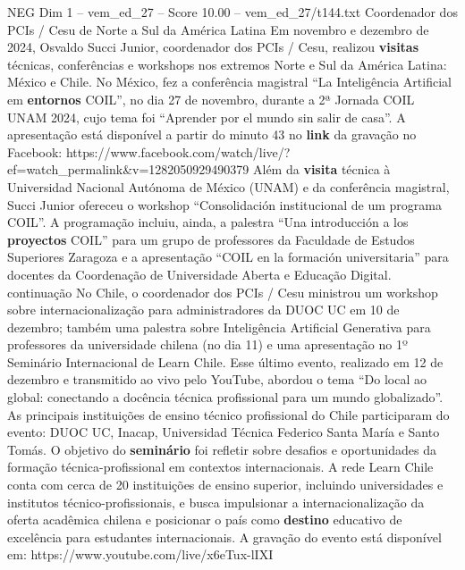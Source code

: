 \begin{textsample}{NEG Dim 1 – vem\_ed\_27 – Score 10.00 – vem\_ed\_27/t144.txt}  \label{ex:f1_neg_170}
Coordenador dos PCIs / Cesu de Norte a Sul da América Latina Em novembro e dezembro de 2024, Osvaldo Succi Junior, coordenador dos PCIs / Cesu, realizou \textbf{visitas} técnicas, conferências e workshops nos extremos Norte e Sul da América Latina: México e Chile.
No México, fez a conferência magistral “La Inteligência Artificial em \textbf{entornos} COIL”, no dia 27 de novembro, durante a 2ª Jornada COIL UNAM 2024, cujo tema foi “Aprender por el mundo sin salir de casa”.
A apresentação está disponível a partir do minuto 43 no \textbf{link} da gravação no Facebook: https://www.facebook.com/watch/live/?ef=watch\_permalink\&v=1282050929490379 Além da \textbf{visita} técnica à Universidad Nacional Autónoma de México (UNAM) e da conferência magistral, Succi Junior ofereceu o workshop “Consolidación institucional de um programa COIL”.
A programação incluiu, ainda, a palestra “Una introducción a los \textbf{proyectos} COIL” para um grupo de professores da Faculdade de Estudos Superiores Zaragoza e a apresentação “COIL en la formación universitaria” para docentes da Coordenação de Universidade Aberta e Educação Digital. continuação No Chile, o coordenador dos PCIs / Cesu ministrou um workshop sobre internacionalização para administradores da DUOC UC em 10 de dezembro; também uma palestra sobre Inteligência Artificial Generativa para professores da universidade chilena (no dia 11) e uma apresentação no 1º Seminário Internacional de Learn Chile.
Esse último evento, realizado em 12 de dezembro e transmitido ao vivo pelo YouTube, abordou o tema “Do local ao global: conectando a docência técnica profissional para um mundo globalizado”.
As principais instituições de ensino técnico profissional do Chile participaram do evento: DUOC UC, Inacap, Universidad Técnica Federico Santa María e Santo Tomás.
O objetivo do \textbf{seminário} foi refletir sobre desafios e oportunidades da formação técnica-profissional em contextos internacionais.
A rede Learn Chile conta com cerca de 20 instituições de ensino superior, incluindo universidades e institutos técnico-profissionais, e busca impulsionar a internacionalização da oferta acadêmica chilena e posicionar o país como \textbf{destino} educativo de excelência para estudantes internacionais.
A gravação do evento está disponível em: https://www.youtube.com/live/x6eTux-lIXI

\end{textsample}

